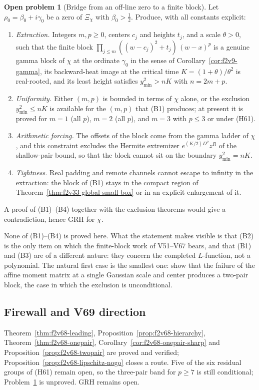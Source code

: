 \documentclass[11pt]{article}
\theoremstyle{definition}
\newtheorem{problem}[theorem]{Open problem}
\theoremstyle{remark}
\begin{document}
\begin{problem}[Bridge from an off-line zero to a finite block]
\label{prob:f2v68-bridge}
Let \(\rho_0=\beta_0+i\gamma_0\) be a zero of \(\Xi_\chi\) with
\(\beta_0>\tfrac12\).  Produce, with all constants explicit:
\begin{enumerate}[label=\textup{(B\arabic*)}]
\item \emph{Extraction.}  Integers \(m,p\ge0\), centers \(c_j\) and heights
\(t_j\), and a scale \(\theta>0\), such that the finite block
\(\prod_{j\le m}((w-c_j)^2+t_j)\,(w-x)^p\) is a genuine gamma block of
\(\chi\) at the ordinate \(\gamma_0\) in the sense of
Corollary~\ref{cor:f2v9-gamma}, its backward-heat image at the critical
time \(K=(1+\theta)/\theta^2\) is real-rooted, and its least height
satisfies \(y_{\min}^2>nK\) with \(n=2m+p\).
\item \emph{Uniformity.}  Either \((m,p)\) is bounded in terms of \(\chi\)
alone, or the exclusion \(y_{\min}^2\le nK\) is available for the
\((m,p)\) that \textup{(B1)} produces; at present it is proved for
\(m=1\) (all \(p\)), \(m=2\) (all \(p\)), and \(m=3\) with \(p\le3\) or
under (H61).
\item \emph{Arithmetic forcing.}  The offsets of the block come from the
gamma ladder of \(\chi\), and this constraint excludes the Hermite
extremizer \(e^{(K/2)D^2}z^R\) of the shallow-pair bound, so that the
block cannot sit on the boundary \(y_{\min}^2=nK\).
\item \emph{Tightness.}  Real padding and remote channels cannot escape to
infinity in the extraction: the block of \textup{(B1)} stays in the
compact region of Theorem~\ref{thm:f2v33-global-small-box} or in an
explicit enlargement of it.
\end{enumerate}
A proof of \textup{(B1)}--\textup{(B4)} together with the exclusion
theorems would give a contradiction, hence GRH for \(\chi\).
\end{problem}

None of (B1)--(B4) is proved here.  What the statement makes visible is
that (B2) is the only item on which the finite-block work of V51--V67
bears, and that (B1) and (B3) are of a different nature: they concern
the completed \(L\)-function, not a polynomial.  The natural first case
is the smallest one: show that the failure of the affine moment matrix
at a single Gaussian scale and center produces a two-pair block, the
case in which the exclusion is unconditional.

\subsection*{Firewall and V69 direction}
\label{fire:f2v68}
Theorem~\ref{thm:f2v68-leading}, Proposition~\ref{prop:f2v68-hierarchy},
Theorem~\ref{thm:f2v68-onepair}, Corollary~\ref{cor:f2v68-onepair-sharp}
and Proposition~\ref{prop:f2v68-twopair} are proved and verified;
Proposition~\ref{prop:f2v68-lipschitz-nogo} closes a route.  Five of the
six residual groups of (H61) remain open, so the three-pair band for
\(p\ge7\) is still conditional; Problem~\ref{prob:f2v68-bridge} is
unproved.  GRH remains open.
\end{document}
